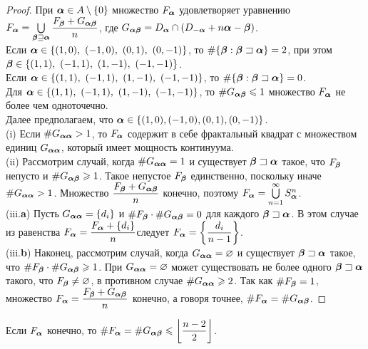 \begin{proof}
При ${\bm{\alpha}}\in A\setminus\{0\}$ множество $F_{\bm{\alpha}}$ удовлетворяет уравнению
$F_{\bm{\alpha}}=\bigcup\limits_{{\bm{\beta}}\sqsupseteq{\bm{\alpha}}} \dfrac{F_{\bm{\beta}}+G_{{\bm{\alpha}}{\bm{\beta}}}}{n}$, 
где $G_{{\bm{\alpha}}{\bm{\beta}}}=D_{\bm{\alpha}}\cap(D_{-{\bm{\alpha}}}+n{\bm{\alpha}}-{\bm{\beta}})$.\\
Если $\bma\in\{(1,0),\ (-1,0),\ (0,1),\ (0,-1)\}$, то $\#\{{\bm{\beta}}:{\bm{\beta}}\sqsupset{\bm{\alpha}}\}=2$, при этом $\bmb\in\{(1,1),\ (-1,1),\ (1,-1),\ (-1,-1)\}$.\\
Если $\bma\in\{(1,1),\ (-1,1),\ (1,-1),\ (-1,-1)\}$, то $\#\{{\bm{\beta}}:{\bm{\beta}}\sqsupset{\bm{\alpha}}\}=0$.\\

Для $\bma\in\{(1,1),\ (-1,1),\ (1,-1),\ (-1,-1)\}$, то $\#G_{{\bm{\alpha}}{\bm{\beta}}}\leqslant1$ множество $F_{\bm{\alpha}}$ не более чем одноточечно.\\

Далее предполагаем, что ${\bm{\alpha}}\in\{(1,0), (-1,0), (0,1), (0,-1)\}$.\\

(i) Если $\#G_{{\bm{\alpha}}{\bm{\alpha}}}> 1$, то $F_{\bm{\alpha}}$ содержит в себе фрактальный квадрат с множеством единиц $G_{{\bm{\alpha}}{\bm{\alpha}}}$, который имеет мощность континуума.\\

(ii) Рассмотрим случай, когда $\#G_{{\bm{\alpha}}{\bm{\alpha}}}=1$ и существует ${\bm{\beta}}\sqsupset{\bm{\alpha}}$ такое, что  $F_{\bm{\beta}}$ непусто и $\#G_{{\bm{\alpha}}{\bm{\beta}}}\geqslant1$. 
Такое непустое $F_{\bm{\beta}}$ единственно, поскольку иначе $\#G_{{\bm{\alpha}}{\bm{\alpha}}}>1$.
Множество $\dfrac{F_{\bm{\beta}}+G_{{\bm{\alpha}}{\bm{\beta}}}}{n}$ конечно, поэтому $F_{\bm{\alpha}}=\bigcup\limits_{n=1}^\infty S_{\bm{\alpha}}^n$.\\

(iii.{\bf a}) Пусть $G_{{\bm{\alpha}}{\bm{\alpha}}}=\{d_i\}$ и $\#F_{\bm{\beta}}\cdot\#G_{{\bm{\alpha}}{\bm{\beta}}}=0$ для каждого ${\bm{\beta}}\sqsupset{\bm{\alpha}}$.
В этом случае из равенства $F_{\bm{\alpha}}=\dfrac{F_{\bm{\alpha}}+\{d_i\}}{n}$следует $F_{\bm{\alpha}}=\left\{\dfrac{d_i}{n-1}\right\}$.\\

(iii.{\bf b}) Наконец, рассмотрим случай, когда $G_{{\bm{\alpha}}{\bm{\alpha}}}=\varnothing$ и существует ${\bm{\beta}}\sqsupset{\bm{\alpha}}$ такое, что $\#F_{\bm{\beta}}\cdot\#G_{{\bm{\alpha}}{\bm{\beta}}}\geqslant1$.
При $G_{{\bm{\alpha}}{\bm{\alpha}}}=\varnothing$ может существовать не более одного ${\bm{\beta}}\sqsupset{\bm{\alpha}}$ такого, что $F_{\bm{\beta}}\neq\varnothing$, в противном случае $\#G_{{\bm{\alpha}}{\bm{\alpha}}}\geqslant2$.
Так как $\#F_{\bm{\beta}}=1$, множество $F_{\bm{\alpha}}=\dfrac{F_{\bm{\beta}}+G_{{\bm{\alpha}}{\bm{\beta}}}}{n}$ конечно, а говоря точнее, $\#F_{\bm{\alpha}}=\#G_{{\bm{\alpha}}{\bm{\beta}}}$.
\end{proof}

\begin{corollary}\label{onepoint} 
Если $F_{\bm{\alpha}}$ конечно, то  $\#F_{\bm{\alpha}}=\#G_{{\bm{\alpha}}{\bm{\beta}}}\leqslant\left\lfloor\dfrac{n-2}{2}\right\rfloor$.
\end{corollary}

